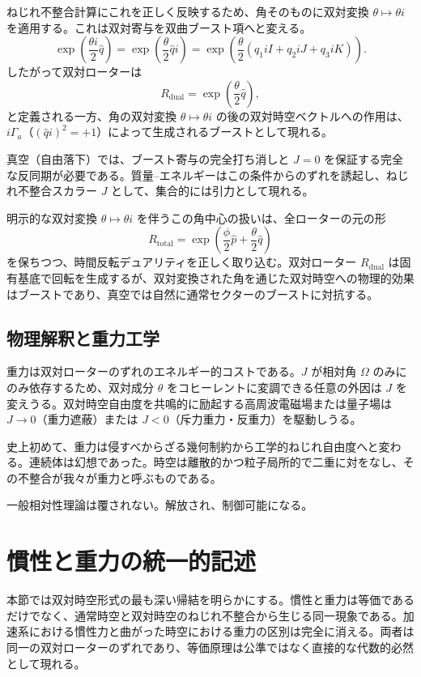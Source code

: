 \documentclass[dvipdfmx,a4paper]{article}
\begin{document}
ねじれ不整合計算にこれを正しく反映するため、角そのものに双対変換 $\theta \mapsto \theta i$ を適用する。これは双対寄与を双曲ブースト項へと変える。
\[
\exp\left( \frac{\theta i}{2} \hat{q} \right) = \exp\left( \frac{\theta}{2} \hat{q}i \right) = \exp\left( \frac{\theta}{2} (q_1 iI + q_2 iJ + q_3 iK) \right).
\]
したがって双対ローターは
\[
R_\text{dual} = \exp\left( \frac{\theta}{2} \hat{q} \right),
\]
と定義される一方、角の双対変換 $\theta \mapsto \theta i$ の後の双対時空ベクトルへの作用は、$i\Gamma_a$（$(\hat{q}i)^2 = +1$）によって生成されるブーストとして現れる。

真空（自由落下）では、ブースト寄与の完全打ち消しと $J=0$ を保証する完全な反同期が必要である。質量--エネルギーはこの条件からのずれを誘起し、ねじれ不整合スカラー $J$ として、集合的には引力として現れる。

明示的な双対変換 $\theta \mapsto \theta i$ を伴うこの角中心の扱いは、全ローターの元の形
\[
R_\text{total} = \exp\left( \frac{\phi}{2} \hat{p} + \frac{\theta}{2} \hat{q} \right)
\]
を保ちつつ、時間反転デュアリティを正しく取り込む。双対ローター $R_\text{dual}$ は固有基底で回転を生成するが、双対変換された角を通じた双対時空への物理的効果はブーストであり、真空では自然に通常セクターのブーストに対抗する。

\subsection{物理解釈と重力工学}

重力は双対ローターのずれのエネルギー的コストである。$J$ が相対角 $\Omega$ のみにのみ依存するため、双対成分 $\theta$ をコヒーレントに変調できる任意の外因は $J$ を変えうる。双対時空自由度を共鳴的に励起する高周波電磁場または量子場は $J \to 0$（重力遮蔽）または $J < 0$（斥力重力・反重力）を駆動しうる。

史上初めて、重力は侵すべからざる幾何制約から工学的ねじれ自由度へと変わる。連続体は幻想であった。時空は離散的かつ粒子局所的で二重に対をなし、その不整合が我々が重力と呼ぶものである。

一般相対性理論は覆されない。解放され、制御可能になる。

\section{慣性と重力の統一的記述}
\label{sec:unified}

本節では双対時空形式の最も深い帰結を明らかにする。慣性と重力は等価であるだけでなく、通常時空と双対時空のねじれ不整合から生じる同一現象である。加速系における慣性力と曲がった時空における重力の区別は完全に消える。両者は同一の双対ローターのずれであり、等価原理は公準ではなく直接的な代数的必然として現れる。
\end{document}
